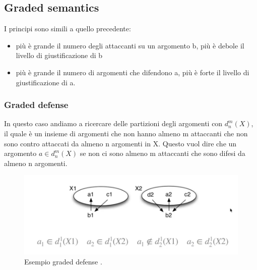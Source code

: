 \subsection{Graded semantics}
I principi sono simili a quello precedente:
\begin{itemize}
    \item più è grande il numero degli attaccanti su un argomento b, più è debole il livello di giustificazione di b
    \item più è grande il numero di argomenti che difendono a, più è forte il livello di giustificazione di a.
\end{itemize}

\subsubsection{Graded defense}
In questo caso andiamo a ricercare delle partizioni degli argomenti con $d_n^{m}(X)$, il quale è un insieme di argomenti che non hanno almeno m attaccanti che non sono contro attaccati da almeno n argomenti in X. Questo vuol dire che un argomento $a\in d_n^{m}(X)$ se non ci sono almeno m attaccanti che sono difesi da almeno n argomenti.
\begin{figure}[H]
    \centering
    \includegraphics[width=13cm, keepaspectratio]{img/es_graded_defense.png}
    \caption{Esempio graded defense .}\label{fig:es_graded_defense}
\end{figure}

